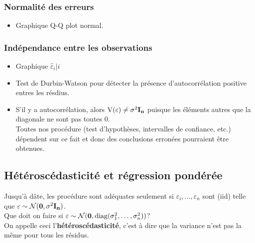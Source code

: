 \documentclass[10pt, french]{article}
\begin{document}
\begin{multicols*}{3}
\subsubsection*{Normalité des erreurs}

\begin{itemize}
\item Graphique Q-Q plot normal.
\end{itemize}

\subsubsection*{Indépendance entre les observations}
\begin{itemize}
\item Graphique $\hat{\varepsilon}_i | i$
\item Test de Durbin-Watson pour détecter la présence d'autocorrélation positive entres les résdius.
\item S'il y a autocorrélation, alors $\text{V}(\varepsilon) \not= \sigma^{2} \mathbf{I_n}$ puisque les éléments autres que la diagonale ne sont pas toutes 0. \\
Toutes nos procédure (test d'hypothèses, intervalles de confiance, etc.) dépendent sur ce fait et donc des conclusions erronées pourraient être obtenues.
\end{itemize}

\subsection*{Hétéroscédasticité et régression pondérée}

Jusqu'à dâte, les procédure sont adéquates seulement si $\varepsilon_i, \dots, \varepsilon_n$ sont (iid) telle que $\varepsilon \sim \mathcal{N}(\mathbf{0}, \sigma^{2}\mathbf{I_n})$.\\
Que doit on faire si $\varepsilon \sim \mathcal{N}(\mathbf{0}, 
\text{diag}(\sigma^{2}_{1}, \dots, \sigma^{2}_{n}))$?\\
On appelle ceci l'\textbf{hétéroscédasticité}, c'est à dire que la variance n'est pas la même pour tous les résidus.



\end{multicols*}
\end{document}
